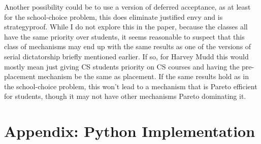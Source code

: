 \documentclass[12pt,letterpaper]{extarticle}
\begin{document}
Another possibility could be to use a version of deferred acceptance, as at least for the school-choice problem, this does eliminate justified envy and is strategyproof. While I do not explore this in the paper, because the classes all have the same priority over students, it seems reasonable to suspect that this class of mechanisms may end up with the same results as one of the versions of serial dictatorship briefly mentioned earlier. If so, for Harvey Mudd this would mostly mean just giving CS students priority on CS courses and having the pre-placement mechanism be the same as placement. If the same results hold as in the school-choice problem, this won't lead to a mechanism that is Pareto efficient for students, though it may not have other mechanisms Pareto dominating it.




\section{Appendix: Python Implementation}


\end{document}
